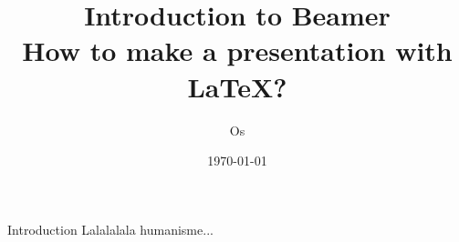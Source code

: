 \documentclass{beamer}
\title[Title]{Introduction  to Beamer\\How to make a presentation with LaTeX?}
\author{Os}
\institute{DIKU}
\date{\today}
\begin{document}
\begin{frame}
\titlepage
\end{frame}


\begin{frame}{Introduction}
Lalalalala humanisme...
\end{frame}
\end{document}
